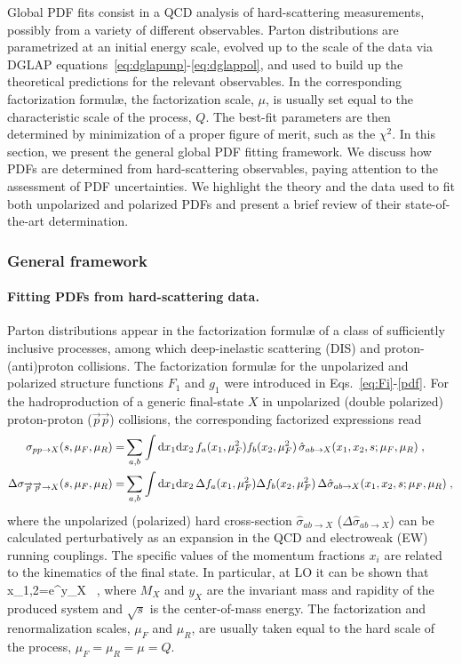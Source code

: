 Global PDF fits consist in a QCD analysis of hard-scattering measurements, 
possibly from a variety of different observables.
%
Parton distributions are parametrized at an initial energy scale, 
evolved up to the scale of the data via DGLAP 
equations~\eqref{eq:dglapunp}-\eqref{eq:dglappol}, and used to build up the 
theoretical predictions for the relevant observables.
%
In the corresponding factorization formul\ae, the factorization scale, $\mu$,
is usually set equal to the characteristic scale of the process, $Q$.
%
The best-fit parameters are then determined by minimization of a proper figure
of merit, such as the $\chi^2$.
%
In this section, we present the general global PDF fitting framework.
%
We discuss how PDFs are determined from hard-scattering observables,
paying attention to the assessment of PDF uncertainties.
%
We highlight the theory and the data used to fit both unpolarized and 
polarized PDFs and present a brief review of their state-of-the-art 
determination.

\subsubsection{General framework}

\paragraph*{Fitting PDFs from hard-scattering data.} 
Parton distributions appear in the factorization formul{\ae} of a class of 
sufficiently inclusive processes, among which deep-inelastic scattering (DIS) 
and proton-(anti)proton collisions.
%
The factorization formul{\ae} for the unpolarized and polarized structure 
functions $F_1$ and $g_1$ were introduced in Eqs.~\eqref{eq:Fi}-\eqref{pdf}.
%
For the hadroproduction of a generic final-state $X$ in unpolarized 
(double polarized) proton-proton ($\overrightarrow{p}\overrightarrow{p}$) 
collisions, the corresponding factorized expressions read
\begin{align}
\sigma_{pp\to X}(s,\mu_F,\mu_R)=&\sum_{a,b}\int {\rm d}x_1 {\rm d}x_2\, 
f_a(x_1,\mu_F^2)f_b(x_2,\mu_F^2)\,
\hat{\sigma}_{ab\to X}(x_1,x_2,s;\mu_{F},\mu_R)\;,
\label{eq:LHCxsecunp}
\\
\Delta\sigma_{\overrightarrow{p}\overrightarrow{p}\to X}(s,\mu_F,\mu_R)=&\sum_{a,b}\int {\rm d}x_1 {\rm d}x_2\, 
\Delta f_a(x_1,\mu_F^2)\Delta f_b(x_2,\mu_F^2)\,
\Delta\hat{\sigma}_{ab\to X}(x_1,x_2,s;\mu_{F},\mu_R)\;,
\label{eq:LHCxsecpol}
\end{align}
where the unpolarized (polarized) hard cross-section 
$\hat{\sigma}_{ab\to X}$ ($\Delta\hat{\sigma}_{ab\to X}$) can be calculated 
perturbatively as an expansion in the QCD and electroweak (EW) 
running couplings.
%
The specific values of the momentum fractions
$x_i$ are related to the kinematics of the final state.
%
In particular, at LO it can be shown that
\be
x_{1,2}=e^{\pm y_X} \, ,
\ee
where $M_X$ and $y_X$ are the invariant mass and rapidity of the produced 
system and $\sqrt{s}$ is the center-of-mass energy.
%
The factorization and renormalization scales, $\mu_F$ and $\mu_R$, are 
usually taken equal to the hard scale of the process, $\mu_F=\mu_R=\mu=Q$.

